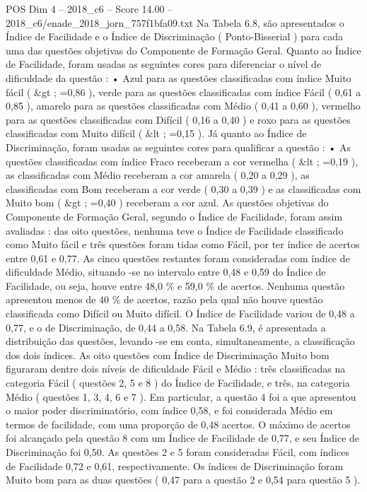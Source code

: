 \begin{textsample}{POS Dim 4 – 2018\_c6 – Score 14.00 – 2018\_c6/enade\_2018\_jorn\_757f1bfa09.txt}
Na Tabela 6.8, são apresentados o Índice de Facilidade e o Índice de Discriminação ( Ponto-Bisserial ) para cada uma das questões objetivas do Componente de Formação Geral.
Quanto ao Índice de Facilidade, foram usadas as seguintes cores para diferenciar o nível de dificuldade da questão : • Azul para as questões classificadas com índice Muito fácil ( \&gt ; =0,86 ), verde para as questões classificadas com índice Fácil ( 0,61 a 0,85 ), amarelo para as questões classificadas com Médio ( 0,41 a 0,60 ), vermelho para as questões classificadas com Difícil ( 0,16 a 0,40 ) e roxo para as questões classificadas com Muito difícil ( \&lt ; =0,15 ).
Já quanto ao Índice de Discriminação, foram usadas as seguintes cores para qualificar a questão : • As questões classificadas com índice Fraco receberam a cor vermelha ( \&lt ; =0,19 ), as classificadas com Médio receberam a cor amarela ( 0,20 a 0,29 ), as classificadas com Bom receberam a cor verde ( 0,30 a 0,39 ) e as classificadas com Muito bom ( \&gt ; =0,40 ) receberam a cor azul.
As questões objetivas do Componente de Formação Geral, segundo o Índice de Facilidade, foram assim avaliadas : das oito questões, nenhuma teve o Índice de Facilidade classificado como Muito fácil e três questões foram tidas como Fácil, por ter índice de acertos entre 0,61 e 0,77.
As cinco questões restantes foram consideradas com índice de dificuldade Médio, situando -se no intervalo entre 0,48 e 0,59 do Índice de Facilidade, ou seja, houve entre 48,0 \% e 59,0 \% de acertos.
Nenhuma questão apresentou menos de 40 \% de acertos, razão pela qual não houve questão classificada como Difícil ou Muito difícil.
O Índice de Facilidade variou de 0,48 a 0,77, e o de Discriminação, de 0,44 a 0,58.
Na Tabela 6.9, é apresentada a distribuição das questões, levando -se em conta, simultaneamente, a classificação dos dois índices.
As oito questões com Índice de Discriminação Muito bom figuraram dentre dois níveis de dificuldade Fácil e Médio : três classificadas na categoria Fácil ( questões 2, 5 e 8 ) do Índice de Facilidade, e três, na categoria Médio ( questões 1, 3, 4, 6 e 7 ).
Em particular, a questão 4 foi a que apresentou o maior poder discriminatório, com índice 0,58, e foi considerada Médio em termos de facilidade, com uma proporção de 0,48 acertos.
O máximo de acertos foi alcançado pela questão 8 com um Índice de Facilidade de 0,77, e seu Índice de Discriminação foi 0,50.
As questões 2 e 5 foram consideradas Fácil, com índices de Facilidade 0,72 e 0,61, respectivamente.
Os índices de Discriminação foram Muito bom para as duas questões ( 0,47 para a questão 2 e 0,54 para questão 5 ).

\end{textsample}
